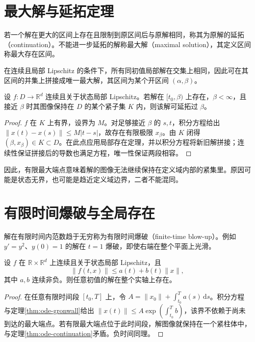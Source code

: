 \documentclass[UTF8,12pt,a4paper,fontset=fandol]{ctexbook}
\begin{document}
\section{最大解与延拓定理}
\begin{definition}
若一个解在更大的区间上存在且限制到原区间后与原解相同，称其为原解的延拓（continuation）。不能进一步延拓的解称最大解（maximal solution），其定义区间称最大存在区间。
\end{definition}

在连续且局部 Lipschitz 的条件下，所有同初值局部解在交集上相同，因此可在其区间的并集上拼接成唯一最大解，其区间为某个开区间 $(\alpha,\beta)$。

\begin{theorem}[有限端点的延拓判据]
\label{thm:ode-continuation}
设 $f:D\to\mathbb R^d$ 连续且关于状态局部 Lipschitz。若解在 $[t_0,\beta)$ 上存在，$\beta<\infty$，且接近 $\beta$ 时其图像保持在 $D$ 的某个紧子集 $K$ 内，则该解可延拓过 $\beta$。
\end{theorem}
\begin{proof}
$f$ 在 $K$ 上有界，设界为 $M$。对足够接近 $\beta$ 的 $s,t$，积分方程给出 $\|x(t)-x(s)\|\leq M|t-s|$，故存在有限极限 $x_\beta$。由 $K$ 闭得 $(\beta,x_\beta)\in K\subset D$。在此点应用局部存在定理，并以积分方程将新旧解拼接；连续性保证拼接后的导数也满足方程，唯一性保证两段相容。
\end{proof}

因此，有限最大端点意味着解的图像无法继续保持在定义域内部的紧集里。原因可能是状态无界，也可能是趋近定义域边界，二者不能混同。

\section{有限时间爆破与全局存在}
解在有限时间内范数趋于无穷称为有限时间爆破（finite-time blow-up）。例如 $y'=y^2$、$y(0)=1$ 的解在 $t=1$ 爆破，即使右端在整个平面上光滑。

\begin{theorem}[线性增长条件]
设 $f$ 在 $\mathbb R\times\mathbb R^d$ 上连续且关于状态局部 Lipschitz，且
\[
 \|f(t,x)\|\leq a(t)+b(t)\|x\|,
\]
其中 $a,b$ 连续非负。则任意初值的解在整个实轴上存在。
\end{theorem}
\begin{proof}
在任意有限时间段 $[t_0,T]$ 上，令 $A=\|x_0\|+\int_{t_0}^T a(s)\,\mathrm ds$。积分方程与定理\ref{thm:ode-gronwall}给出 $\|x(t)\|\leq A\exp(\int_{t_0}^T b)$，该界不依赖于尚未到达的最大端点。若有限最大端点位于此时间段，解图像就保持在一个紧柱体中，与定理\ref{thm:ode-continuation}矛盾。负时间同理。
\end{proof}
\end{document}
